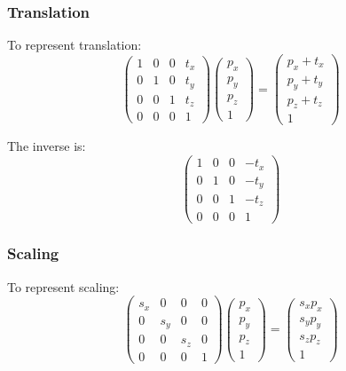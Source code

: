 \documentclass[11pt]{article}
\begin{document}
\subsubsection{Translation}
To represent translation:
\[
  \begin{pmatrix}
    1 & 0 & 0 & t_x \\
    0 & 1 & 0 & t_y \\
    0 & 0 & 1 & t_z \\
    0 & 0 & 0 & 1
  \end{pmatrix}
  \begin{pmatrix}
    p_x \\
    p_y \\
    p_z \\
    1
  \end{pmatrix}
  =
  \begin{pmatrix}
    p_x + t_x \\
    p_y + t_y \\
    p_z + t_z \\
    1
  \end{pmatrix}
\]

The inverse is:
\[
  \begin{pmatrix}
    1 & 0 & 0 & -t_x \\
    0 & 1 & 0 & -t_y \\
    0 & 0 & 1 & -t_z \\
    0 & 0 & 0 & 1
  \end{pmatrix}
\]

\subsubsection{Scaling}
To represent scaling:
\[
  \begin{pmatrix}
    s_x & 0 & 0 & 0 \\
    0 & s_y & 0 & 0 \\
    0 & 0 & s_z & 0 \\
    0 & 0 & 0 & 1
  \end{pmatrix}
  \begin{pmatrix}
    p_x \\
    p_y \\
    p_z \\
    1
  \end{pmatrix}
  =
  \begin{pmatrix}
    s_xp_x \\
    s_yp_y \\
    s_zp_z \\
    1
  \end{pmatrix}
\]
\end{document}
